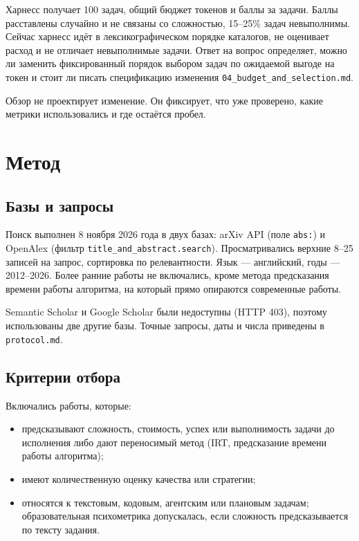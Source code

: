 \documentclass[11pt,a4paper]{article}
\begin{document}
Харнесс получает 100 задач, общий бюджет токенов и баллы за задачи. Баллы
расставлены случайно и не связаны со сложностью, 15--25\% задач невыполнимы.
Сейчас харнесс идёт в лексикографическом порядке каталогов, не оценивает
расход и не отличает невыполнимые задачи. Ответ на вопрос определяет, можно
ли заменить фиксированный порядок выбором задач по ожидаемой выгоде на токен
и стоит ли писать спецификацию изменения
\texttt{04\_budget\_and\_selection.md}.

Обзор не проектирует изменение. Он фиксирует, что уже проверено, какие
метрики использовались и где остаётся пробел.

\section{Метод}

\subsection{Базы и запросы}

Поиск выполнен 8 ноября 2026 года в двух базах: arXiv API (поле
\texttt{abs:}) и OpenAlex (фильтр \texttt{title\_and\_abstract.search}).
Просматривались верхние 8--25 записей на запрос, сортировка по релевантности.
Язык — английский, годы — 2012--2026. Более ранние работы не включались,
кроме метода предсказания времени работы алгоритма, на который прямо
опираются современные работы.

Semantic Scholar и Google Scholar были недоступны (HTTP 403), поэтому
использованы две другие базы. Точные запросы, даты и числа приведены в
\texttt{protocol.md}.

\subsection{Критерии отбора}

Включались работы, которые:
\begin{itemize}
  \item предсказывают сложность, стоимость, успех или выполнимость задачи до
        исполнения либо дают переносимый метод (IRT, предсказание времени
        работы алгоритма);
  \item имеют количественную оценку качества или стратегии;
  \item относятся к текстовым, кодовым, агентским или плановым задачам;
        образовательная психометрика допускалась, если сложность
        предсказывается по тексту задания.
\end{itemize}
\end{document}
